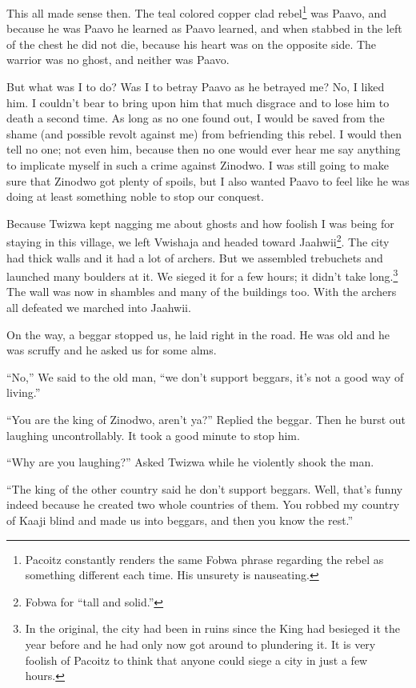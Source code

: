 This all made sense then. The teal colored copper clad rebel\footnote{Pacoitz constantly renders the same Fo\-bwa phrase regarding the rebel as something different each time. His unsurety is nauseating.} was Paavo, and because he was Paavo he learned as Paavo learned, and when stabbed in the left of the chest he did not die, because his heart was on the opposite side. The warrior was no ghost, and neither was Paavo.

But what was I to do? Was I to betray Paavo as he betrayed me?
No, I liked him.
I couldn't bear to bring upon him that much disgrace and to lose him to death a second time.
As long as no one found out, I would be saved from the shame (and possible revolt against me) from befriending this rebel. I would then tell no one; not even him, because then no one would ever hear me say anything to implicate myself in such a crime against Zinodwo. I was still going to make sure that Zinodwo got plenty of spoils, but I also wanted Paavo to feel like he was doing at least something noble to stop our conquest.

\tbreak

Because Twizwa kept nagging me about ghosts and how foolish I was being for staying in this village, we left Vwishaja and headed toward Jaa\-hwii\footnote{Fo\-bwa for ``tall and solid.''}. The city had thick walls and it had a lot of archers. But we assembled trebuchets and launched many boulders at it. We sieged it for a few hours; it didn't take long.\footnote{In the original, the city had been in ruins since the King had besieged it the year before and he had only now got around to plundering it. It is very foolish of Pacoitz to think that anyone could siege a city in just a few hours.} The wall was now in shambles and many of the buildings too. With the archers all defeated we marched into Jaa\-hwii.

On the way, a beggar stopped us, he laid right in the road. He was old and he was scruffy and he asked us for some alms.

``No,'' We said to the old man, ``we don't support beggars, it's not a good way of living.''

``You are the king of Zinodwo, aren't ya?'' Replied the beggar. Then he burst out laughing uncontrollably. It took a good minute to stop him.

``Why are you laughing?'' Asked Twizwa while he violently shook the man.

``The king of the other country said he don't support beggars. Well, that's funny indeed because he created two whole countries of them. You robbed my country of Kaaji blind and made us into beggars, and then you know the rest.''

